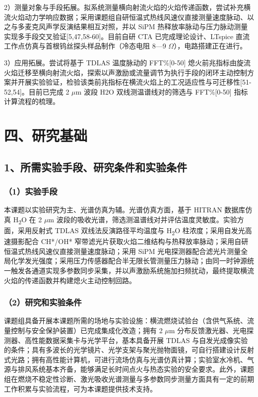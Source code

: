 \documentclass[UTF8,a4paper,zihao=-4,fontset=windows]{ctexart}
\begin{document}
2）测量对象与手段拓展。拟系统测量横向射流火焰的火焰传递函数，尝试补充横流火焰动力学响应数据；采用课题组自研恒温式热线风速仪直接测量速度脉动、以之与多麦克风声学反演结果相互对照，并以 SiPM 热释放率脉动与压力脉动测量实现多手段交叉验证[5,47,58-60]。目前自研 CTA 已完成理论设计、LTspice 直流工作点仿真与首根钨丝探头样品制作（冷态电阻 8—9 $\Omega$），电路搭建正在进行。

3）应用拓展。尝试将基于 TDLAS 温度脉动的 FFT\%[0-50] 熄火前兆指标由旋流火焰迁移至横向射流火焰，探索以声激励或流量调节为执行手段的闭环主动控制方案并开展实验验证，检验该类前兆指标在横流火焰上的工况适应性与可迁移性[51-52,54]。目前已完成 2 $\mu$m 波段 H2O 双线测温谱线对的筛选与 FFT\%[0-50] 指标计算流程的梳理。

\section{四、研究基础}
\subsection{1、所需实验手段、研究条件和实验条件}
\subsubsection{（1）实验手段}
本课题以实验研究为主、光谱仿真为辅。光谱仿真方面，基于 HITRAN 数据库仿真 H\textsubscript{2}O 在 2 $\mu$m 波段的吸收光谱，筛选测温谱线对并评估温度灵敏度。实验方面，采用反射式 TDLAS 双线法反演路径平均温度与 H\textsubscript{2}O 柱浓度；采用自发光高速摄影配合 CH*/OH* 窄带滤光片获取火焰二维结构与热释放率脉动；采用自研恒温式热线风速仪直接测量速度脉动；采用 SiPM 光电探测器配合滤光片测量全局化学发光强度；采用压力传感器配合半无限长管测量压力脉动；由同一时钟源统一触发各通道实现多参数同步采集，并以声激励系统施加扫频扰动，最终提取横流火焰的传递函数并构建熄火主动控制回路。

\subsubsection{（2）研究和实验条件}
课题组具备开展本课题所需的场地与实验设施：横流燃烧试验台（含供气系统、流量控制与安全保护装置）已完成集成化改造；拥有 2 $\mu$m 分布反馈激光器、光电探测器、高性能数据采集卡与光学平台，基本具备开展 TDLAS 与自发光成像实验的条件；具有多波长的光学镜片、光学支架与聚光抛物面镜，可自行搭建设计反射式光路；拥有高性能计算机，可进行流场仿真与光谱仿真计算；实验室水冷机、气源与排风系统基本齐备，能够满足长时间点火与热态实验的安全要求。此外，课题组在燃烧不稳定性诊断、激光吸收光谱测量与多参数同步测量方面具有一定的前期工作积累与实验流程，可为本课题提供技术支持。
\end{document}

